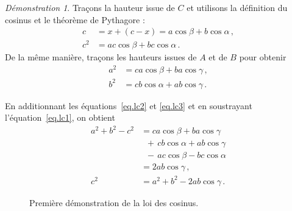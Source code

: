 \noindent \emph{Démonstration 1}.
Traçons la hauteur issue de $C$ et utilisons la définition du cosinus et le théorème de Pythagore :
\begin{subequations}
\begin{align}
c&= x+(c-x)=a\cos \beta + b\cos \alpha\,,\\
c^2&=ac\cos \beta + bc\cos \alpha\,.\label{eq.lc1}
\end{align}
\end{subequations}
De la même manière, traçons  les hauteurs issues de $A$ et de $B$ pour obtenir 
\begin{subequations}
\begin{align}
a^2&=ca\cos \beta + ba\cos \gamma\,,\label{eq.lc2}\\
b^2&=cb\cos \alpha + ab\cos \gamma\,.\label{eq.lc3}
\end{align}
\end{subequations}

En additionnant les équations~\ref{eq.lc2} et \ref{eq.lc3} et en soustrayant l'équation~\ref{eq.lc1}, on obtient 
\begin{align*}
a^2+b^2-c^2&=ca\cos \beta + ba\cos \gamma\\
&\;\; +\,cb\cos \alpha + ab\cos \gamma \\
&\;\; -\,ac\cos \beta - bc\cos \alpha\\
&=2ab\cos \gamma\,,\\
c^2&=a^2+b^2-2ab\cos \gamma\,.\tag*{\qed}
\end{align*}


\begin{figure}[htbp]
\centering
     
\caption{Première démonstration de la loi des cosinus.}\label{f.law-cosines2}
\end{figure}



